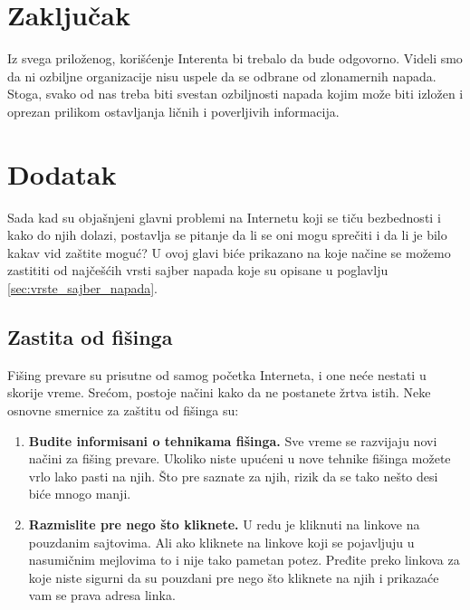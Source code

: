 \documentclass[a4paper]{article}
\theoremstyle{break}
\begin{document}
{\section{Zaključak}
\label{sec:zakljucak}

Iz svega priloženog, korišćenje Interenta bi trebalo da bude odgovorno. Videli smo da ni ozbiljne organizacije nisu uspele da se odbrane od zlonamernih napada. Stoga, svako od nas treba biti svestan ozbiljnosti napada kojim može biti izložen i oprezan prilikom ostavljanja ličnih i poverljivih informacija.
 

\appendix
\raggedright
 



\appendix
\section{Dodatak}
\label{sec:dodatak}
Sada kad su objašnjeni glavni problemi na Internetu koji se tiču bezbednosti i kako do njih dolazi, postavlja se pitanje da li se oni mogu sprečiti i da li je bilo kakav vid zaštite moguć?
U ovoj glavi biće prikazano na koje načine se možemo zastititi od najčešćih vrsti sajber napada koje su opisane u poglavlju \ref{sec:vrste_sajber_napada}.

\subsection{Zastita od fišinga}
\label{subsec:zastita_od_fisinga}
Fišing prevare su prisutne od samog početka Interneta, i one neće nestati u skorije vreme. Srećom, postoje načini kako da ne postanete žrtva istih. Neke osnovne smernice za zaštitu od fišinga su\cite{phishing_protect}:

\begin{enumerate}
\item \textbf{Budite informisani o tehnikama fišinga.} Sve vreme se razvijaju novi načini za fišing prevare. Ukoliko niste upućeni u nove tehnike fišinga možete vrlo lako pasti na njih. Što pre saznate za njih, rizik da se tako nešto desi biće mnogo manji.

\item \textbf{Razmislite pre nego što kliknete.} U redu je kliknuti na linkove na pouzdanim sajtovima. Ali ako kliknete na linkove koji se pojavljuju u nasumičnim mejlovima to i nije tako pametan potez. Pređite preko linkova za koje niste sigurni da su pouzdani pre nego što kliknete na njih i prikazaće vam se prava adresa linka.


\end{enumerate}}
\end{document}
